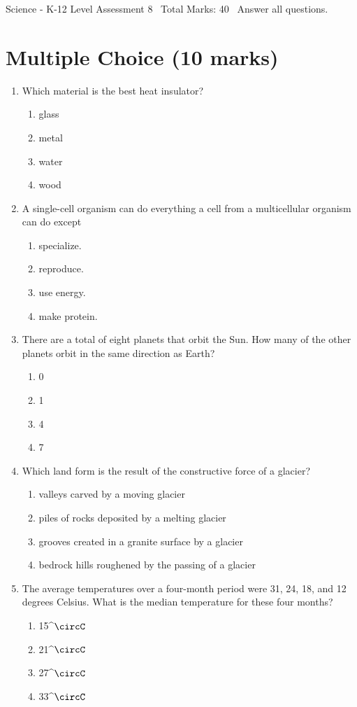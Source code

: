 \documentclass[12pt]{article}
\begin{document}
\begin{center}
Science - K-12 Level Assessment 8 \
Total Marks: 40 \
Answer all questions.
\end{center}

\section*{Multiple Choice (10 marks)}
\begin{enumerate}[label=\arabic*.]
\item Which material is the best heat insulator?
\begin{enumerate}[label=(\alph*)]
    \item glass
    \item metal
    \item water
    \item wood
\end{enumerate}
\item A single-cell organism can do everything a cell from a multicellular organism can do except
\begin{enumerate}[label=(\alph*)]
    \item specialize.
    \item reproduce.
    \item use energy.
    \item make protein.
\end{enumerate}
\item There are a total of eight planets that orbit the Sun. How many of the other planets orbit in the same direction as Earth?
\begin{enumerate}[label=(\alph*)]
    \item 0
    \item 1
    \item 4
    \item 7
\end{enumerate}
\item Which land form is the result of the constructive force of a glacier?
\begin{enumerate}[label=(\alph*)]
    \item valleys carved by a moving glacier
    \item piles of rocks deposited by a melting glacier
    \item grooves created in a granite surface by a glacier
    \item bedrock hills roughened by the passing of a glacier
\end{enumerate}
\item The average temperatures over a four-month period were 31, 24, 18, and 12 degrees Celsius. What is the median temperature for these four months?
\begin{enumerate}[label=(\alph*)]
    \item 15^\ensuremath{\circC}
    \item 21^\ensuremath{\circC}
    \item 27^\ensuremath{\circC}
    \item 33^\ensuremath{\circC}
\end{enumerate}
\end{enumerate}
\end{document}
